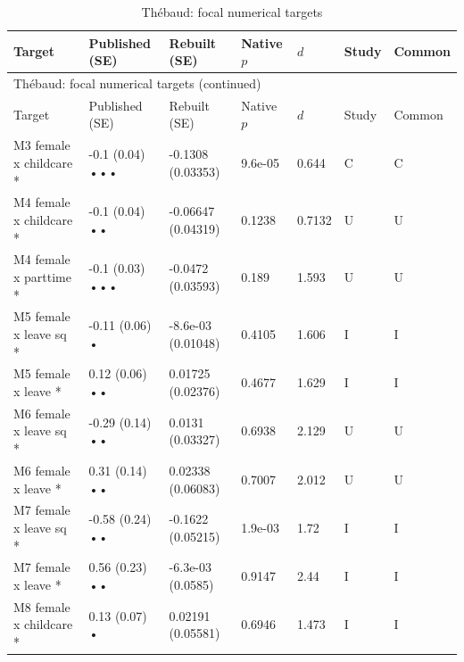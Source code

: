 {\scriptsize\setlength{\tabcolsep}{3pt}\renewcommand{\arraystretch}{1.06}
\begin{longtable}{@{}p{.245\linewidth}p{.17\linewidth}p{.17\linewidth}p{.085\linewidth}p{.060\linewidth}p{.08\linewidth}p{.07\linewidth}@{}}
\caption{Thébaud: focal numerical targets}\label{tab:focal:thebaud2015}\\
\toprule Target & Published (SE) & Rebuilt (SE) & Native $p$ & $d$ & Study & Common\\\midrule
\endfirsthead\multicolumn{7}{l}{\small Thébaud: focal numerical targets (continued)}\\\toprule Target & Published (SE) & Rebuilt (SE) & Native $p$ & $d$ & Study & Common\\\midrule\endhead\bottomrule\endfoot
M3 female x childcare * & -0.1 (0.04) ••• & -0.1308 (0.03353) & 9.6e-05 & 0.644 & C & C\\
M4 female x childcare * & -0.1 (0.04) •• & -0.06647 (0.04319) & 0.1238 & 0.7132 & U & U\\
M4 female x parttime * & -0.1 (0.03) ••• & -0.0472 (0.03593) & 0.189 & 1.593 & U & U\\
M5 female x leave sq * & -0.11 (0.06) • & -8.6e-03 (0.01048) & 0.4105 & 1.606 & I & I\\
M5 female x leave * & 0.12 (0.06) •• & 0.01725 (0.02376) & 0.4677 & 1.629 & I & I\\
M6 female x leave sq * & -0.29 (0.14) •• & 0.0131 (0.03327) & 0.6938 & 2.129 & U & U\\
M6 female x leave * & 0.31 (0.14) •• & 0.02338 (0.06083) & 0.7007 & 2.012 & U & U\\
M7 female x leave sq * & -0.58 (0.24) •• & -0.1622 (0.05215) & 1.9e-03 & 1.72 & I & I\\
M7 female x leave * & 0.56 (0.23) •• & -6.3e-03 (0.0585) & 0.9147 & 2.44 & I & I\\
M8 female x childcare * & 0.13 (0.07) • & 0.02191 (0.05581) & 0.6946 & 1.473 & I & I\\
\end{longtable}}
